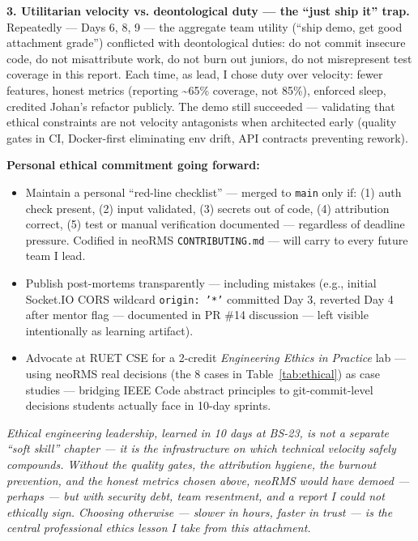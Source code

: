 \textbf{3. Utilitarian velocity vs. deontological duty --- the ``just ship it'' trap.} Repeatedly --- Days 6, 8, 9 --- the aggregate team utility (``ship demo, get good attachment grade'') conflicted with deontological duties: do not commit insecure code, do not misattribute work, do not burn out juniors, do not misrepresent test coverage in this report. Each time, as lead, I chose duty over velocity: fewer features, honest metrics (reporting \textasciitilde65\% coverage, not 85\%), enforced sleep, credited Johan's refactor publicly. The demo still succeeded --- validating that ethical constraints are not velocity antagonists when architected early (quality gates in CI, Docker-first eliminating env drift, API contracts preventing rework).

\textbf{Personal ethical commitment going forward:}
\begin{itemize}
\item Maintain a personal ``red-line checklist'' --- merged to \texttt{main} only if: (1) auth check present, (2) input validated, (3) secrets out of code, (4) attribution correct, (5) test or manual verification documented --- regardless of deadline pressure. Codified in neoRMS \texttt{CONTRIBUTING.md} --- will carry to every future team I lead.
\item Publish post-mortems transparently --- including mistakes (e.g., initial Socket.IO CORS wildcard \texttt{origin: '*'} committed Day 3, reverted Day 4 after mentor flag --- documented in PR \#14 discussion --- left visible intentionally as learning artifact).
\item Advocate at RUET CSE for a 2-credit \textit{Engineering Ethics in Practice} lab --- using neoRMS real decisions (the 8 cases in Table~\ref{tab:ethical}) as case studies --- bridging IEEE Code abstract principles to git-commit-level decisions students actually face in 10-day sprints.
\end{itemize}

\textit{Ethical engineering leadership, learned in 10 days at BS-23, is not a separate ``soft skill'' chapter --- it is the infrastructure on which technical velocity safely compounds. Without the quality gates, the attribution hygiene, the burnout prevention, and the honest metrics chosen above, neoRMS would have demoed --- perhaps --- but with security debt, team resentment, and a report I could not ethically sign. Choosing otherwise --- slower in hours, faster in trust --- is the central professional ethics lesson I take from this attachment.}
